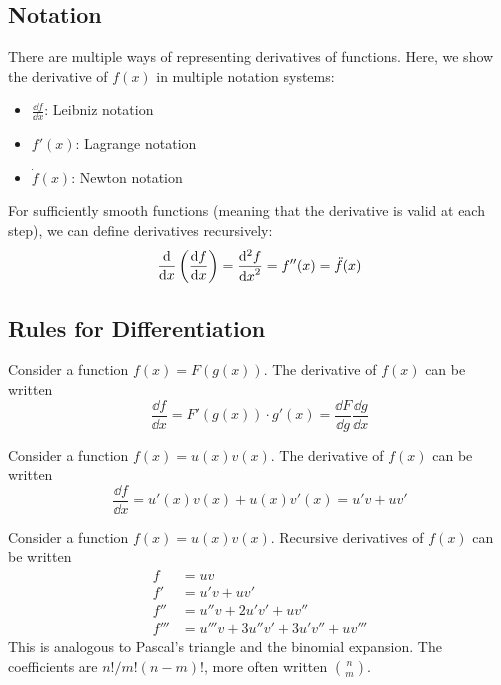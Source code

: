 \subsection{Notation}
There are multiple ways of representing derivatives of functions.
Here, we show the derivative of \(f(x)\) in multiple notation systems:
\begin{itemize}
	\item \(\displaystyle \frac{\dd{f}}{\dd{x}}\): Leibniz notation
	\item \(f'(x)\): Lagrange notation
	\item \(\dot f (x)\): Newton notation
\end{itemize}

For sufficiently smooth functions (meaning that the derivative is valid at each step), we can define derivatives recursively:
\[
	\frac{\mathrm{d}}{\dd{x}}\left( \frac{\dd{f}}{\dd{x}} \right)
	= \frac{\mathrm{d}^2f}{\dd{x}^2}
	= f''(x) = \ddot f (x)
\]

\subsection{Rules for Differentiation}
\begin{definition}
	Consider a function \(f(x) = F(g(x))\).
	The derivative of \(f(x)\) can be written
	\begin{equation}
		\frac{\dd{f}}{\dd{x}} = F'(g(x)) \cdot g'(x) = \frac{\dd{F}}{\dd{g}} \frac{\dd{g}}{\dd{x}}
	\end{equation}
\end{definition}

\begin{definition}
	Consider a function \(f(x) = u(x)v(x)\).
	The derivative of \(f(x)\) can be written
	\begin{equation}
		\frac{\dd{f}}{\dd{x}} = u'(x)v(x) + u(x)v'(x) = u'v + uv'
	\end{equation}
\end{definition}

\begin{definition}
	Consider a function \(f(x) = u(x)v(x)\).
	Recursive derivatives of \(f(x)\) can be written
	\begin{align}
		f    & = uv                                        \\
		f'   & = u'v + uv' \nonumber                       \\
		f''  & = u''v + 2u'v' + uv'' \nonumber             \\
		f''' & = u'''v + 3u''v' + 3u'v'' + uv''' \nonumber
	\end{align}
	This is analogous to Pascal's triangle and the binomial expansion.
	The coefficients are \(n!/m!(n-m)!\), more often written \(n \choose m\).
\end{definition}

